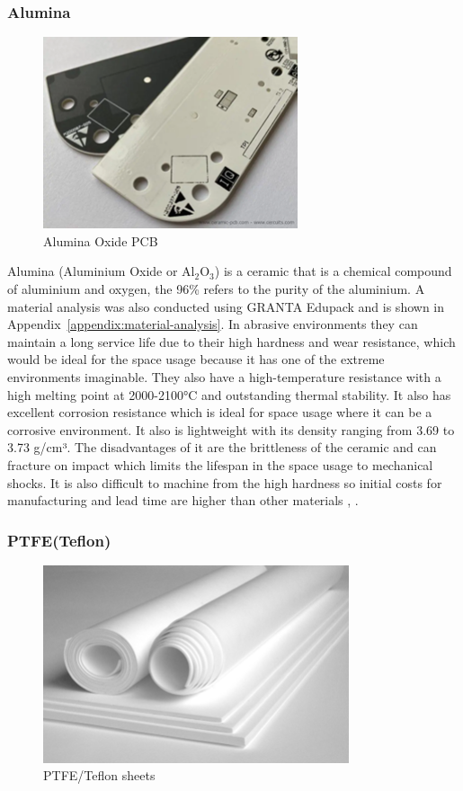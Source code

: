 \subsubsection{Alumina}

\begin{figure}[htbp]
    \centering
    \includegraphics[width=7.5cm]{chapters/methodology/MaterialAnalysis/Fig2AluminaPCB.png}
    \caption{Alumina Oxide PCB \cite{CERCuits2025}}
    \label{fig:alumina-pcb}
\end{figure}
Alumina (Aluminium Oxide or Al$_2$O$_3$) is a ceramic that is a chemical compound of aluminium and oxygen, the 96\% refers to the purity of the aluminium.
A material analysis was also conducted using GRANTA Edupack and is shown in Appendix~\ref{appendix:material-analysis}. 
In abrasive environments they can maintain a long service life due to their high hardness and wear resistance, which would be ideal for the space usage because it has one of the extreme environments imaginable. 
They also have a high-temperature resistance with a high melting point at 2000-2100°C and outstanding thermal stability. 
It also has excellent corrosion resistance which is ideal for space usage where it can be a corrosive environment. 
It also is lightweight with its density ranging from 3.69 to 3.73 g/cm³. 
The disadvantages of it are the brittleness of the ceramic and can fracture on impact which limits the lifespan in the space usage to mechanical shocks. 
It is also difficult to machine from the high hardness so initial costs for manufacturing and lead time are higher than other materials \cite{mascera-tec}, \cite{Vhandy}.

\subsubsection{PTFE(Teflon)}

\begin{figure}[htbp]
    \centering
    \includegraphics[width=9cm]{chapters/methodology/MaterialAnalysis/Fig3PTFE.png}
    \caption{PTFE/Teflon sheets \cite{Imimg2025}}
    \label{fig:ptfe-sheets}
\end{figure}

